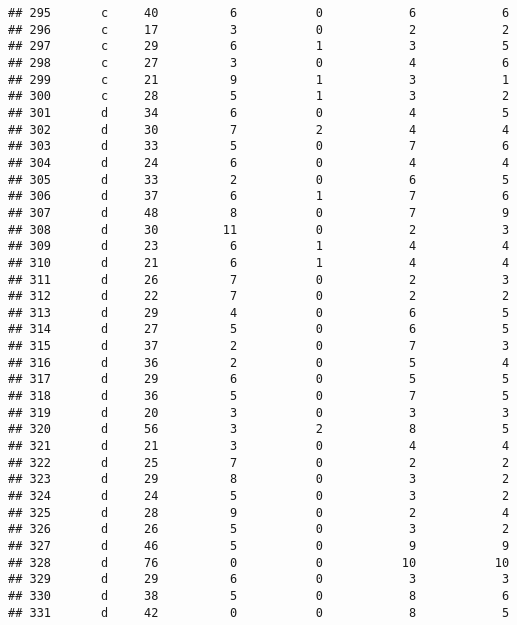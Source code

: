 \documentclass[
]{article}
\begin{document}
\begin{verbatim}
## 295       c     40          6           0            6            6
## 296       c     17          3           0            2            2
## 297       c     29          6           1            3            5
## 298       c     27          3           0            4            6
## 299       c     21          9           1            3            1
## 300       c     28          5           1            3            2
## 301       d     34          6           0            4            5
## 302       d     30          7           2            4            4
## 303       d     33          5           0            7            6
## 304       d     24          6           0            4            4
## 305       d     33          2           0            6            5
## 306       d     37          6           1            7            6
## 307       d     48          8           0            7            9
## 308       d     30         11           0            2            3
## 309       d     23          6           1            4            4
## 310       d     21          6           1            4            4
## 311       d     26          7           0            2            3
## 312       d     22          7           0            2            2
## 313       d     29          4           0            6            5
## 314       d     27          5           0            6            5
## 315       d     37          2           0            7            3
## 316       d     36          2           0            5            4
## 317       d     29          6           0            5            5
## 318       d     36          5           0            7            5
## 319       d     20          3           0            3            3
## 320       d     56          3           2            8            5
## 321       d     21          3           0            4            4
## 322       d     25          7           0            2            2
## 323       d     29          8           0            3            2
## 324       d     24          5           0            3            2
## 325       d     28          9           0            2            4
## 326       d     26          5           0            3            2
## 327       d     46          5           0            9            9
## 328       d     76          0           0           10           10
## 329       d     29          6           0            3            3
## 330       d     38          5           0            8            6
## 331       d     42          0           0            8            5

\end{verbatim}
\end{document}
